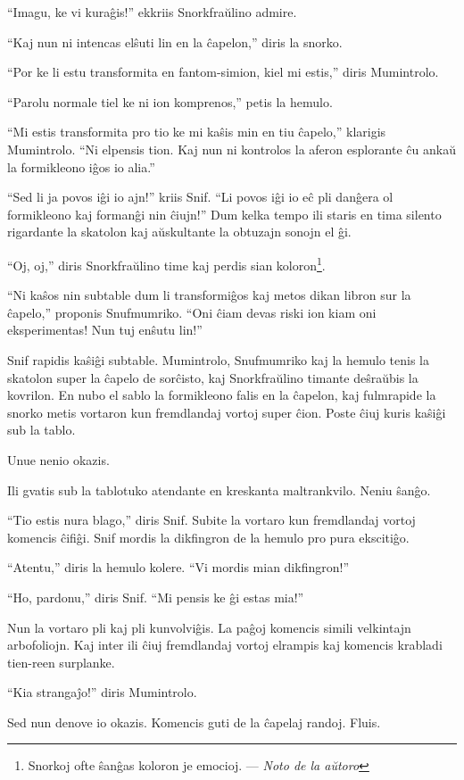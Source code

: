 ``Imagu, ke vi kuraĝis!'' ekkriis Snorkfraŭlino admire.

``Kaj nun ni intencas elŝuti lin en la ĉapelon,'' diris la snorko.

``Por ke li estu transformita en fantom-simion, kiel mi estis,'' diris Mumintrolo.

``Parolu normale tiel ke ni ion komprenos,'' petis la hemulo.

``Mi estis transformita pro tio ke mi kaŝis min en tiu ĉapelo,'' klarigis Mumintrolo. ``Ni elpensis tion. Kaj nun ni kontrolos la aferon esplorante ĉu ankaŭ la formikleono iĝos io alia.''

``Sed li ja povos iĝi io ajn!'' kriis Snif. ``Li povos iĝi io eĉ pli danĝera ol formikleono kaj formanĝi nin ĉiujn!'' Dum kelka tempo ili staris en tima silento rigardante la skatolon kaj aŭskultante la obtuzajn sonojn el ĝi.

``Oj, oj,'' diris Snorkfraŭlino time kaj perdis sian koloron\footnote{Snorkoj ofte ŝanĝas koloron je emocioj. --- \emph{Noto de la aŭtoro}}.

``Ni kaŝos nin subtable dum li transformiĝos kaj metos dikan libron sur la ĉapelo,'' proponis Snufmumriko. ``Oni ĉiam devas riski ion kiam oni eksperimentas! Nun tuj enŝutu lin!''

Snif rapidis kaŝiĝi subtable. Mumintrolo, Snufmumriko kaj la hemulo tenis la skatolon super la ĉapelo de sorĉisto, kaj Snorkfraŭlino timante deŝraŭbis la kovrilon. En nubo el sablo la formikleono falis en la ĉapelon, kaj fulmrapide la snorko metis vortaron kun fremdlandaj vortoj super ĉion. Poste ĉiuj kuris kaŝiĝi sub la tablo.

Unue nenio okazis.

Ili gvatis sub la tablotuko atendante en kreskanta maltrankvilo. Neniu ŝanĝo.

``Tio estis nura blago,'' diris Snif. Subite la vortaro kun fremdlandaj vortoj komencis ĉifiĝi. Snif mordis la dikfingron de la hemulo pro pura ekscitiĝo.

``Atentu,'' diris la hemulo kolere. ``Vi mordis mian dikfingron!''

``Ho, pardonu,'' diris Snif. ``Mi pensis ke ĝi estas mia!''

Nun la vortaro pli kaj pli kunvolviĝis. La paĝoj komencis simili velkintajn arbofoliojn. Kaj inter ili ĉiuj fremdlandaj vortoj elrampis kaj komencis krabladi tien-reen surplanke.

``Kia strangaĵo!'' diris Mumintrolo.

Sed nun denove io okazis. Komencis guti de la ĉapelaj randoj. Fluis.

